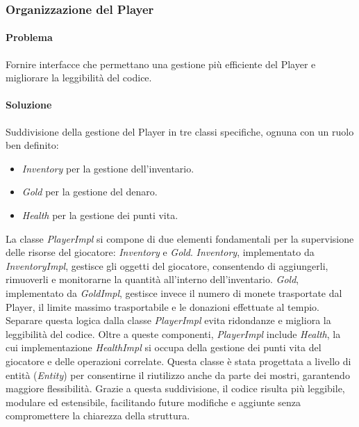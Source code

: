 \documentclass{report}
\begin{document}
\subsubsection{Organizzazione del Player}

\paragraph{Problema} Fornire interfacce che permettano una gestione più efficiente del Player e migliorare la leggibilità del codice.

\paragraph{Soluzione} Suddivisione della gestione del Player in tre classi specifiche, ognuna con un ruolo ben definito:

\begin{itemize}
    \item \textit{Inventory} per la gestione dell'inventario.
    \item \textit{Gold} per la gestione del denaro.
    \item \textit{Health} per la gestione dei punti vita.
\end{itemize}

La classe \textit{PlayerImpl} si compone di due elementi fondamentali per la supervisione delle risorse del giocatore: \textit{Inventory} e \textit{Gold}. \newline
%
\textit{Inventory}, implementato da \textit{InventoryImpl}, gestisce gli oggetti del giocatore, consentendo di aggiungerli, rimuoverli e monitorarne la quantità
%
all’interno dell’inventario. \textit{Gold}, implementato da \textit{GoldImpl}, gestisce invece il numero di monete trasportate dal Player, il limite massimo trasportabile
%
e le donazioni effettuate al tempio. \newline
%
Separare questa logica dalla classe \textit{PlayerImpl} evita ridondanze e migliora la leggibilità del codice. \newline
%
Oltre a queste componenti, \textit{PlayerImpl} include \textit{Health}, la cui implementazione \textit{HealthImpl} si occupa della gestione dei punti vita del giocatore e
%
delle operazioni correlate. Questa classe è stata progettata a livello di entità (\textit{Entity}) per consentirne il riutilizzo anche da parte dei mostri, garantendo maggiore flessibilità. \newline
%
Grazie a questa suddivisione, il codice risulta più leggibile, modulare ed estensibile, facilitando future modifiche e aggiunte senza compromettere la chiarezza della struttura.
\end{document}
